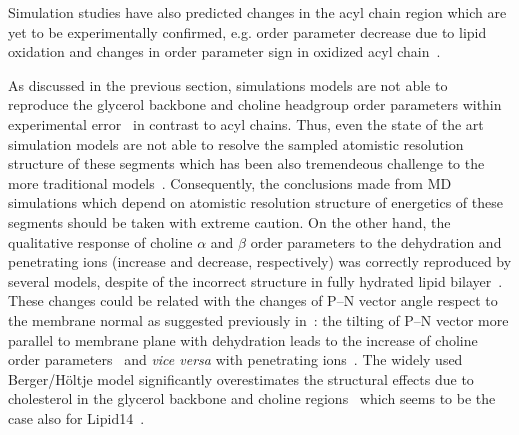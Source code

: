 \documentclass[aps,prl,superscriptaddress,twocolumn]{revtex4}
\begin{document}
Simulation studies have also predicted changes in the acyl chain region which are yet to be experimentally 
confirmed, e.g. order parameter decrease due to lipid oxidation and changes in order parameter sign in oxidized 
acyl chain~\cite{ekkabut07}. %


As discussed in the previous section, simulations models are not able to reproduce the glycerol backbone 
and choline headgroup order parameters within experimental error~\cite{botan15} in contrast to acyl chains.
Thus, even the state of the art simulation models are not able to resolve the sampled atomistic resolution
structure of these segments which has been also tremendeous challenge to the more traditional models~\cite{??}.
Consequently, the conclusions made from MD simulations which depend on atomistic resolution structure
of energetics of these segments should be taken with extreme caution.
On the other hand, the qualitative response of choline $\alpha$ and $\beta$ order parameters to the dehydration 
and penetrating ions (increase and decrease, respectively) was correctly reproduced by several models, 
despite of the incorrect structure in fully hydrated lipid bilayer~\cite{botan15,ionpaper}.
These changes could be related with the changes of P--N vector angle respect to the membrane normal as 
suggested previously in~\cite{??}: the tilting of P--N vector more parallel to membrane plane with
dehydration leads to the increase of choline order parameters~\cite{botan15} and {\it vice versa} with penetrating ions~\cite{ionpaper}.
The widely used Berger/Höltje model significantly overestimates the structural effects due to cholesterol 
in the glycerol backbone and choline regions~\cite{ferreira13,botan15} which seems to be the 
case also for Lipid14~\cite{madej15}.
\end{document}
